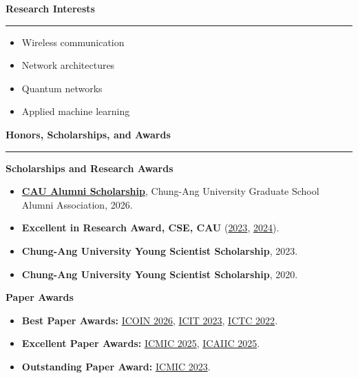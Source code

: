 \documentclass[10pt,letterpaper]{article}
\newcommand{\sectiontitle}[1]{%
  \vspace{0.9em}
  {\large\bfseries #1}\par
  \vspace{0.25em}\hrule\vspace{0.55em}
}
\begin{document}
\sectiontitle{Research Interests}
\begin{itemize}[leftmargin=*, itemsep=0.15em, topsep=0.1em]
  \item Wireless communication
  \item Network architectures
  \item Quantum networks
  \item Applied machine learning
\end{itemize}

\sectiontitle{Honors, Scholarships, and Awards}
\textbf{Scholarships and Research Awards}
\begin{itemize}[leftmargin=*, itemsep=0.15em, topsep=0.25em]
  \item \href{https://drive.google.com/file/d/1a4FmcNO91bNRaNoxplvLfU9CgAFlcJVx/view?usp=sharing}{\textbf{CAU Alumni Scholarship}}, Chung-Ang University Graduate School Alumni Association, 2026.
  \item \textbf{Excellent in Research Award, CSE, CAU} (\href{https://drive.google.com/file/d/13WquTjBo9kkiQZ4vNZdtM5UN8z5UvPab/view?usp=sharing}{2023}, \href{https://drive.google.com/file/d/123MNi4yrVPy6EILjp2KJpLrNg-8tVKhJ/view?usp=sharing}{2024}).
  \item \textbf{Chung-Ang University Young Scientist Scholarship}, 2023.
  \item \textbf{Chung-Ang University Young Scientist Scholarship}, 2020.
\end{itemize}

\textbf{Paper Awards}
\begin{itemize}[leftmargin=*, itemsep=0.15em, topsep=0.25em]
  \item \textbf{Best Paper Awards:} \href{https://drive.google.com/file/d/1Bu7LsQcCD5mHXK4rK0SQcPnpVCJFuczD/view?usp=sharing}{ICOIN 2026}, \href{https://drive.google.com/file/d/1nmO8RbS9UWM1-diFeMO696oj6WLFA2wB/view?usp=sharing}{ICIT 2023}, \href{https://drive.google.com/file/d/1Qv_9UvXPBEzNMTLVPSvhye9zlkwZo3tn/view?usp=sharing}{ICTC 2022}.
  \item \textbf{Excellent Paper Awards:} \href{https://drive.google.com/file/d/1_T4DhmYP7aT-1yhaPvO2Zeh986qgn67X/view?usp=sharing}{ICMIC 2025}, \href{https://drive.google.com/file/d/118304a9ZJaVROZDNkQzty7Vf5x8bPrw8/view?usp=sharing}{ICAIIC 2025}.
  \item \textbf{Outstanding Paper Award:} \href{https://drive.google.com/file/d/1nG0K_2kkHfy7VsDOkMeYpx5aUdVsp7V7/view?usp=sharing}{ICMIC 2023}.
\end{itemize}
\end{document}
